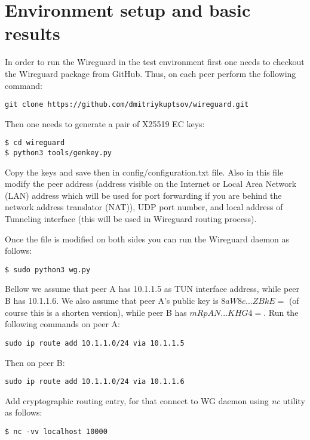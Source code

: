 \section{Environment setup and basic results}
\label{section:results}

In order to run the Wireguard in the test environment first one needs to
checkout the Wireguard package from GitHub. Thus, on each peer perform the 
following command:

\begin{verbatim}
git clone https://github.com/dmitriykuptsov/wireguard.git
\end{verbatim}

Then one needs to generate a pair of X25519 EC keys:

\begin{verbatim}
$ cd wireguard
$ python3 tools/genkey.py
\end{verbatim}

Copy the keys and save then in config/configuration.txt file. Also in this file modify the 
peer address (address visible on the Internet or Local Area Network (LAN) address which will be used for 
port forwarding if you are behind the network address translator (NAT)), UDP port number, and local
address of Tunneling interface (this will be used in Wireguard routing process). 

Once the file is modified on both sides you can run the Wireguard daemon as follows:

\begin{verbatim}
$ sudo python3 wg.py
\end{verbatim}

Bellow we assume that peer A has 10.1.1.5 as TUN interface address, while peer B has 10.1.1.6.
We also assume that peer A's public key is $8aW8c...ZBkE=$ (of course this is a shorten version), 
while peer B has $mRpAN...KHG4=$. Run the following commands on peer A:

\begin{verbatim}
sudo ip route add 10.1.1.0/24 via 10.1.1.5
\end{verbatim}

Then on peer B:

\begin{verbatim}
sudo ip route add 10.1.1.0/24 via 10.1.1.6
\end{verbatim}

Add cryptographic routing entry, for that connect to WG daemon using {\it   nc} utility as follows:

\begin{small}
\begin{verbatim}
$ nc -vv localhost 10000
\end{verbatim}
\end{small}

